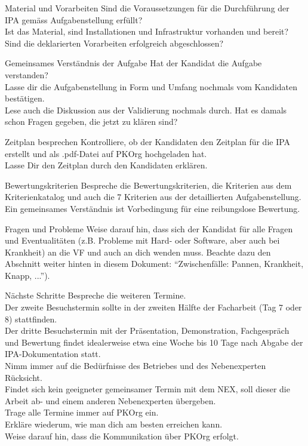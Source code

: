 \begin{taskitem}{Material und Vorarbeiten}
  Sind die Voraussetzungen für die Durchführung der IPA gemäss Aufgabenstellung erfüllt?\\Ist das Material, sind Installationen und Infrastruktur vorhanden und bereit?\\Sind die deklarierten Vorarbeiten erfolgreich abgeschlossen?
\end{taskitem}
\begin{taskitem}{Gemeinsames Verständnis der Aufgabe}
  Hat der Kandidat die Aufgabe verstanden?\\Lasse dir die Aufgabenstellung in Form und Umfang nochmals vom Kandidaten bestätigen.\\Lese auch die Diskussion aus der Validierung nochmals durch. Hat es damals schon Fragen gegeben, die jetzt zu klären sind?
\end{taskitem}
\newpage
\begin{taskitem}{Zeitplan besprechen}
  Kontrolliere, ob der Kandidaten den Zeitplan für die IPA erstellt und als .pdf-Datei auf PKOrg hochgeladen hat.\\Lasse Dir den Zeitplan durch den Kandidaten erklären.
\end{taskitem}
\begin{taskitem}{Bewertungskriterien}
  Bespreche die Bewertungskriterien, die Kriterien aus dem Kriterienkatalog und auch die 7 Kriterien aus der detaillierten Aufgabenstellung.\\Ein gemeinsames Verständnis ist Vorbedingung für eine reibungslose Bewertung.
\end{taskitem}
\begin{taskitem}{Fragen und Probleme}
  Weise darauf hin, dass sich der Kandidat für alle Fragen und Eventualitäten (z.B. Probleme mit Hard- oder Software, aber auch bei Krankheit) an die VF und auch an dich wenden muss. Beachte dazu den Abschnitt weiter hinten in diesem Dokument: \enquote{Zwischenfälle: Pannen, Krankheit, Knapp, ...}).
\end{taskitem}
\newpage
\begin{taskitem}{Nächste Schritte}
  Bespreche die weiteren Termine.\\Der zweite Besuchstermin sollte in der zweiten Hälfte der Facharbeit (Tag 7 oder 8) stattfinden.\\Der dritte Besuchstermin mit der Präsentation, Demonstration, Fachgespräch und Bewertung findet idealerweise etwa eine Woche bis 10 Tage nach Abgabe der IPA-Dokumentation statt.\\Nimm immer auf die Bedürfnisse des Betriebes und des Nebenexperten Rücksicht.\\Findet sich kein geeigneter gemeinsamer Termin mit dem NEX, soll dieser die Arbeit ab- und einem anderen Nebenexperten übergeben.\\Trage alle Termine immer auf PKOrg ein.\\Erkläre wiederum, wie man dich am besten erreichen kann.\\Weise darauf hin, dass die Kommunikation über PKOrg erfolgt.
\end{taskitem}
